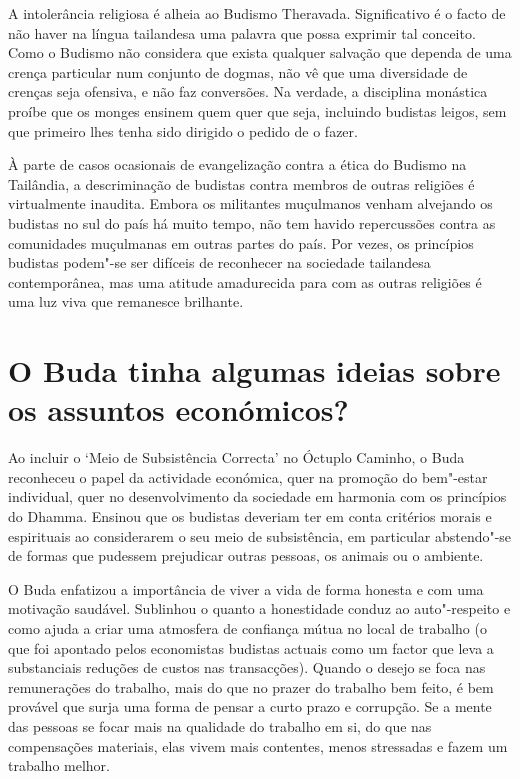 A intolerância religiosa é alheia ao Budismo Theravada. Significativo é
o facto de não haver na língua tailandesa uma palavra que possa exprimir
tal conceito. Como o Budismo não considera que exista qualquer salvação
que dependa de uma crença particular num conjunto de dogmas, não vê que
uma diversidade de crenças seja ofensiva, e não faz conversões. Na
verdade, a disciplina monástica proíbe que os monges ensinem quem quer
que seja, incluindo budistas leigos, sem que primeiro lhes tenha sido
dirigido o pedido de o fazer.

À parte de casos ocasionais de evangelização contra a ética do Budismo
na Tailândia, a descriminação de budistas contra membros de outras
religiões é virtualmente inaudita. Embora os militantes muçulmanos
venham alvejando os budistas no sul do país há muito tempo, não tem
havido repercussões contra as comunidades muçulmanas em outras partes do
país. Por vezes, os princípios budistas podem"-se ser difíceis de
reconhecer na sociedade tailandesa contemporânea, mas uma atitude
amadurecida para com as outras religiões é uma luz viva que remanesce
brilhante.

\section{O Buda tinha algumas ideias sobre os assuntos económicos?}

Ao incluir o `Meio de Subsistência Correcta' no Óctuplo Caminho, o
Buda reconheceu o papel da actividade económica, quer na promoção do
bem"-estar individual, quer no desenvolvimento da sociedade em harmonia
com os princípios do Dhamma. Ensinou que os budistas deveriam ter em
conta critérios morais e espirituais ao considerarem o seu meio de
subsistência, em particular abstendo"-se de formas que pudessem
prejudicar outras pessoas, os animais ou o ambiente.

O Buda enfatizou a importância de viver a vida de forma honesta e com
uma motivação saudável. Sublinhou o quanto a honestidade conduz ao
auto"-respeito e como ajuda a criar uma atmosfera de confiança mútua no
local de trabalho (o que foi apontado pelos economistas budistas actuais
como um factor que leva a substanciais reduções de custos nas
transacções). Quando o desejo se foca nas remunerações do trabalho, mais
do que no prazer do trabalho bem feito, é bem provável que surja uma
forma de pensar a curto prazo e corrupção. Se a mente das pessoas se
focar mais na qualidade do trabalho em si, do que nas compensações
materiais, elas vivem mais contentes, menos stressadas e fazem um
trabalho melhor.

